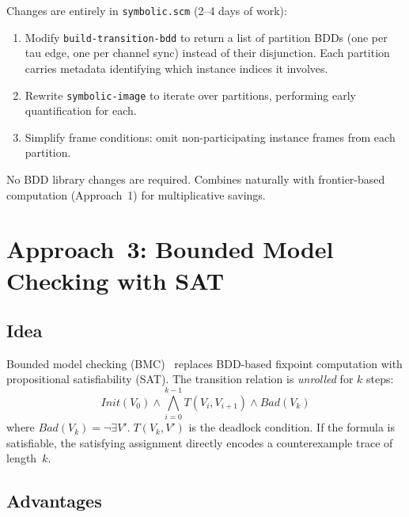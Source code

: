 \documentclass[11pt]{article}
\begin{document}
Changes are entirely in \texttt{symbolic.scm} (2--4 days of work):

\begin{enumerate}
\item Modify \texttt{build-transition-bdd} to return a list of
  partition BDDs (one per tau edge, one per channel sync) instead
  of their disjunction.  Each partition carries metadata identifying
  which instance indices it involves.
\item Rewrite \texttt{symbolic-image} to iterate over partitions,
  performing early quantification for each.
\item Simplify frame conditions: omit non-participating instance
  frames from each partition.
\end{enumerate}

No BDD library changes are required.  Combines naturally with
frontier-based computation (Approach~1) for multiplicative savings.

\section{Approach~3: Bounded Model Checking with SAT}

\subsection{Idea}

Bounded model checking (BMC)~\cite{biere1999} replaces BDD-based
fixpoint computation with propositional satisfiability (SAT).  The
transition relation is \emph{unrolled} for $k$ steps:
%
\begin{equation}
\mathit{Init}(V_0) \wedge
\bigwedge_{i=0}^{k-1} T(V_i, V_{i+1}) \wedge
\mathit{Bad}(V_k)
\label{eq:bmc}
\end{equation}
%
where $\mathit{Bad}(V_k) = \neg\exists V'.\; T(V_k, V')$ is the
deadlock condition.  If the formula is satisfiable, the satisfying
assignment directly encodes a counterexample trace of length~$k$.

\subsection{Advantages}
\end{document}
